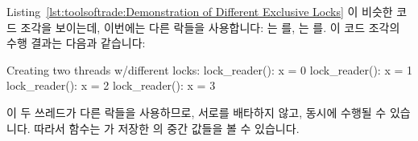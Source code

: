 Listing~\ref{lst:toolsoftrade:Demonstration of Different Exclusive Locks}
이 비슷한 코드 조각을 보이는데, 이번에는 다른 락들을 사용합니다:
 는  를,  는  를.
이 코드 조각의 수행 결과는 다음과 같습니다:

\begin{VerbatimU}
Creating two threads w/different locks:
lock_reader(): x = 0
lock_reader(): x = 1
lock_reader(): x = 2
lock_reader(): x = 3
\end{VerbatimU}

이 두 쓰레드가 다른 락들을 사용하므로, 서로를 배타하지 않고, 동시에 수행될 수
있습니다.
따라서  함수는  가 저장한  의 중간
값들을 볼 수 있습니다.

